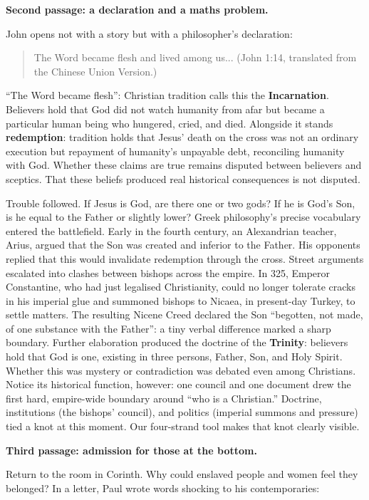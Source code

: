 \textbf{Second passage: a declaration and a maths problem.}

John opens not with a story but with a philosopher's declaration:

\begin{quote}
The Word became flesh and lived among us... (John 1:14, translated from the Chinese Union Version.)
\end{quote}
``The Word became flesh'': Christian tradition calls this the \textbf{Incarnation}. Believers hold that God did not watch humanity from afar but became a particular human being who hungered, cried, and died. Alongside it stands \textbf{redemption}: tradition holds that Jesus' death on the cross was not an ordinary execution but repayment of humanity's unpayable debt, reconciling humanity with God. Whether these claims are true remains disputed between believers and sceptics. That these beliefs produced real historical consequences is not disputed.

Trouble followed. If Jesus is God, are there one or two gods? If he is God's Son, is he equal to the Father or slightly lower? Greek philosophy's precise vocabulary entered the battlefield. Early in the fourth century, an Alexandrian teacher, Arius, argued that the Son was created and inferior to the Father. His opponents replied that this would invalidate redemption through the cross. Street arguments escalated into clashes between bishops across the empire. In 325, Emperor Constantine, who had just legalised Christianity, could no longer tolerate cracks in his imperial glue and summoned bishops to Nicaea, in present-day Turkey, to settle matters. The resulting Nicene Creed declared the Son ``begotten, not made, of one substance with the Father'': a tiny verbal difference marked a sharp boundary. Further elaboration produced the doctrine of the \textbf{Trinity}: believers hold that God is one, existing in three persons, Father, Son, and Holy Spirit. Whether this was mystery or contradiction was debated even among Christians. Notice its historical function, however: one council and one document drew the first hard, empire-wide boundary around ``who is a Christian.'' Doctrine, institutions (the bishops' council), and politics (imperial summons and pressure) tied a knot at this moment. Our four-strand tool makes that knot clearly visible.

\textbf{Third passage: admission for those at the bottom.}

Return to the room in Corinth. Why could enslaved people and women feel they belonged? In a letter, Paul wrote words shocking to his contemporaries:

